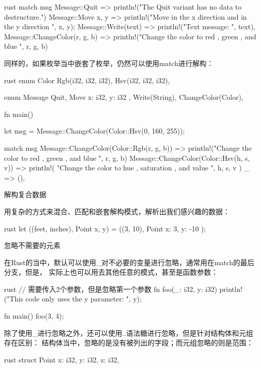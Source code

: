 \begin{outline}[enumerate]
\begin{code-in-enumerate}{rust}
{    match msg {
        Message::Quit => {
            println!("The Quit variant has no data to destructure.")
        }
        Message::Move { x, y } => {
            println!("Move in the x direction {} and in the y direction {}", x, y);
        }
        Message::Write(text) => println!("Text message: {}", text),
        Message::ChangeColor(r, g, b) => {
            println!("Change the color to red {}, green {}, and blue {}", r, g, b)
        }
    }
}
\end{code-in-enumerate}

同样的，如果枚举当中嵌套了枚举，仍然可以使用match进行解构：
\begin{code-in-enumerate}{rust}
enum Color {
    Rgb(i32, i32, i32),
    Hsv(i32, i32, i32),
}

enum Message {
    Quit,
    Move { x: i32, y: i32 },
    Write(String),
    ChangeColor(Color),
}

fn main() {
    let msg = Message::ChangeColor(Color::Hsv(0, 160, 255));

    match msg {
        Message::ChangeColor(Color::Rgb(r, g, b)) => {
            println!("Change the color to red {}, green {}, and blue {}", r, g, b)
        }
        Message::ChangeColor(Color::Hsv(h, s, v)) => {
            println!(
                "Change the color to hue {}, saturation {}, and value {}",
                h, s, v
            )
        }
        _ => (),
    }
}
\end{code-in-enumerate}

\1 解构复合数据

用复杂的方式来混合、匹配和嵌套解构模式，解析出我们感兴趣的数据：
\begin{code-in-enumerate}{rust}
let ((feet, inches), Point {x, y}) = ((3, 10), Point { x: 3, y: -10 });
\end{code-in-enumerate}

\1 忽略不需要的元素

在Rust的当中，默认可以使用\_对不必要的变量进行忽略，通常用在match的最后分支，但是，
实际上也可以用去其他任意的模式，甚至是函数参数：
\begin{code-in-enumerate}{rust}
// 需要传入2个参数，但是忽略第一个参数
fn foo(_: i32, y: i32) {
    println!("This code only uses the y parameter: {}", y);
}

fn main() {
    foo(3, 4);
}
\end{code-in-enumerate}

除了使用\_进行忽略之外，还可以使用..语法糖进行忽略，但是针对结构体和元组存在区别：
结构体当中，忽略的是没有被列出的字段；而元组忽略的则是范围：
\begin{code-in-enumerate}{rust}
struct Point {
    x: i32,
    y: i32,
    z: i32,
}


\end{code-in-enumerate}
\end{outline}
